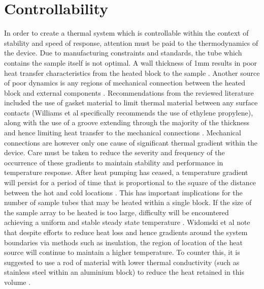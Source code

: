 \section{Controllability}
\label{lit_controlability}
In order to create a thermal system which is controllable within the context of stability and speed of response, attention must be paid to the thermodynamics of the device. Due to manufacturing constraints and standards, the tube which contains the sample itself is not optimal. A wall thickness of 1mm results in poor heat transfer characteristics from the heated block to the sample \cite{1704922}. Another source of poor dynamics is any regions of mechanical connection between the heated block and external components \cite{7238517}. Recommendations from the reviewed literature included the use of gasket material to limit thermal material between any surface contacts (Williams et al specifically recommends the use of ethylene propylene), along with the use of a groove extending through the majority of the thickness and hence limiting heat transfer to the mechanical connections \cite{20130415930883}\cite{20070113880}. Mechanical connections are however only one cause of significant thermal gradient within the device. Care must be taken to reduce the severity and frequency of the occurrence of these gradients to maintain stability and performance in temperature response. After heat pumping has ceased, a temperature gradient will persist for a period of time that is proportional to the square of the distance between the hot and cold locations \cite{7238517}. This has important implications for the number of sample tubes that may be heated within a single block. If the size of the sample array to be heated is too large, difficulty will be encountered achieving a uniform and stable steady state temperature \cite{7238517}. Widomski et al note that despite efforts to reduce heat loss and hence gradients around the system boundaries via methods such as insulation, the region of location of the heat source will continue to maintain a higher temperature. To counter this, it is suggested to use a rod of material with lower thermal conductivity (such as stainless steel within an aluminium block) to reduce the heat retained in this volume \cite{20070113880}.\\

